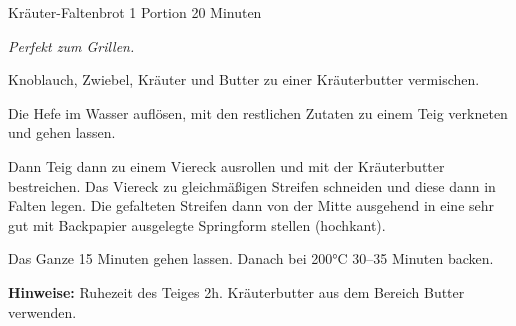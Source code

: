 \begin{recipe}{Kräuter-Faltenbrot} {1 Portion} {20 Minuten}

  \freeform
  \textit{Perfekt zum Grillen.}


  Knoblauch, Zwiebel, Kräuter und Butter zu einer Kräuterbutter vermischen.


  Die Hefe im Wasser auflösen, mit den restlichen Zutaten zu einem Teig verkneten und gehen lassen.

  \newstep
  Dann Teig dann zu einem Viereck ausrollen und mit der Kräuterbutter bestreichen.
  Das Viereck zu gleichmäßigen Streifen schneiden und diese dann in Falten legen.
  Die gefalteten Streifen dann von der Mitte ausgehend in eine sehr gut mit Backpapier ausgelegte Springform stellen (hochkant).

  \newstep
  Das Ganze 15 Minuten gehen lassen.
  Danach bei 200°C 30--35 Minuten backen.

  \freeform
  \hrulefill

  \freeform
  \textbf{Hinweise:}
  Ruhezeit des Teiges 2h.
  Kräuterbutter aus dem Bereich Butter verwenden.

  \end{recipe}
